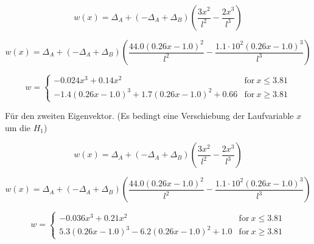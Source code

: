 \documentclass[
  letterpaper,
  DIV=11]{scrreprt}
\begin{document}
\begin{equation}w{\left(x \right)} = \Delta_{A} + \left(- \Delta_{A} + \Delta_{B}\right) \left(\frac{3 x^{2}}{l^{2}} - \frac{2 x^{3}}{l^{3}}\right)\end{equation}

\begin{equation}w{\left(x \right)} = \Delta_{A} + \left(- \Delta_{A} + \Delta_{B}\right) \left(\frac{44.0 \left(0.26 x - 1.0\right)^{2}}{l^{2}} - \frac{1.1 \cdot 10^{2} \left(0.26 x - 1.0\right)^{3}}{l^{3}}\right)\end{equation}

\begin{equation}w = \begin{cases} - 0.024 x^{3} + 0.14 x^{2} & \text{for}\: x \leq 3.81 \\- 1.4 \left(0.26 x - 1.0\right)^{3} + 1.7 \left(0.26 x - 1.0\right)^{2} + 0.66 & \text{for}\: x \geq 3.81 \end{cases}\end{equation}

Für den zweiten Eigenvektor. (Es bedingt eine Verschiebung der
Laufvariable \(x\) um die \(H_1\))

\begin{equation}w{\left(x \right)} = \Delta_{A} + \left(- \Delta_{A} + \Delta_{B}\right) \left(\frac{3 x^{2}}{l^{2}} - \frac{2 x^{3}}{l^{3}}\right)\end{equation}

\begin{equation}w{\left(x \right)} = \Delta_{A} + \left(- \Delta_{A} + \Delta_{B}\right) \left(\frac{44.0 \left(0.26 x - 1.0\right)^{2}}{l^{2}} - \frac{1.1 \cdot 10^{2} \left(0.26 x - 1.0\right)^{3}}{l^{3}}\right)\end{equation}

\begin{equation}w = \begin{cases} - 0.036 x^{3} + 0.21 x^{2} & \text{for}\: x \leq 3.81 \\5.3 \left(0.26 x - 1.0\right)^{3} - 6.2 \left(0.26 x - 1.0\right)^{2} + 1.0 & \text{for}\: x \geq 3.81 \end{cases}\end{equation}
\end{document}
